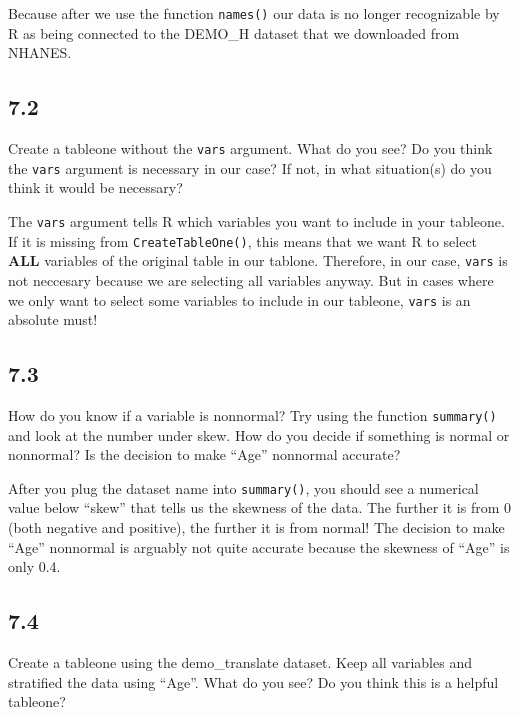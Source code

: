 \documentclass[
]{book}
\begin{document}
Because after we use the function \texttt{names()} our data is no longer recognizable by R as being connected to the DEMO\_H dataset that we downloaded from NHANES.

\hypertarget{section-39}{%
\subsection{7.2}\label{section-39}}

Create a tableone without the \texttt{vars} argument. What do you see?
Do you think the \texttt{vars} argument is necessary in our case? If not, in what situation(s) do you think it would be necessary?

The \texttt{vars} argument tells R which variables you want to include in your tableone. If it is missing from \texttt{CreateTableOne()}, this means that we want R to select \textbf{ALL} variables of the original table in our tablone. Therefore, in our case, \texttt{vars} is not neccesary because we are selecting all variables anyway. But in cases where we only want to select some variables to include in our tableone, \texttt{vars} is an absolute must!

\hypertarget{section-40}{%
\subsection{7.3}\label{section-40}}

How do you know if a variable is nonnormal? Try using the function \texttt{summary()} and look at the number under skew. How do you decide if something is normal or nonnormal? Is the decision to make ``Age'' nonnormal accurate?

After you plug the dataset name into \texttt{summary()}, you should see a numerical value below ``skew'' that tells us the skewness of the data. The further it is from 0 (both negative and positive), the further it is from normal! The decision to make ``Age'' nonnormal is arguably not quite accurate because the skewness of ``Age'' is only 0.4.

\hypertarget{section-41}{%
\subsection{7.4}\label{section-41}}

Create a tableone using the demo\_translate dataset. Keep all variables and stratified the data using ``Age''. What do you see? Do you think this is a helpful tableone?
\end{document}
